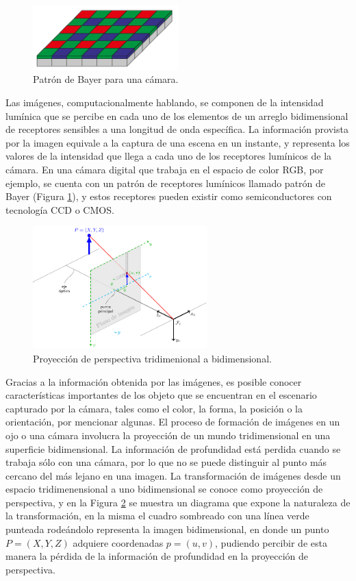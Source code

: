\begin{figure}[htbp!]
	\centering
	\includegraphics[width=0.5\textwidth]{./Figuras/Bayer}
	\caption{Patrón de Bayer para una cámara.}
	\label{fig:Bayer}
\end{figure}
\par Las imágenes, computacionalmente hablando, se componen de la intensidad lumínica que se percibe en cada uno de los elementos de un arreglo bidimensional de receptores sensibles a una longitud de onda específica. La información provista por la imagen equivale a la captura de una escena en un instante, y representa los valores de la intensidad que llega a cada uno de los receptores lumínicos de la cámara. En una cámara digital que trabaja en el espacio de color RGB, por ejemplo, se cuenta con un patrón de receptores lumínicos llamado patrón de Bayer (Figura \ref{fig:Bayer}), y estos receptores pueden existir como semiconductores con tecnología CCD o CMOS.
\begin{figure}[htbp!]
	\centering
	\includegraphics[width=0.6\textwidth]{./Figuras/Perspectiva}
	\caption{Proyección de perspectiva tridimenional a bidimensional.}
	\label{fig:Per}
\end{figure}
\par Gracias a la información obtenida por las imágenes, es posible conocer características importantes de los objeto que se encuentran en el escenario capturado por la cámara, tales como el color, la forma, la posición o la orientación, por mencionar algunas. El proceso de formación de imágenes en un ojo o una cámara involucra la proyección de un mundo tridimensional en una superficie bidimensional. La información de profundidad está perdida cuando se trabaja sólo con una cámara, por lo que no se puede distinguir al punto más cercano del más lejano en una imagen. La transformación de imágenes desde un espacio tridimenensional a uno bidimensional se conoce como proyección de perspectiva, y en la Figura \ref{fig:Per} se muestra un diagrama que expone la naturaleza de la transformación, en la misma el cuadro sombreado con una línea verde punteada rodeándolo representa la imagen bidimensional, en donde un punto $P=(X, Y, Z)$ adquiere coordenadas $p=(u, v)$, pudiendo percibir de esta manera la pérdida de la información de profundidad en la proyección de perspectiva.

